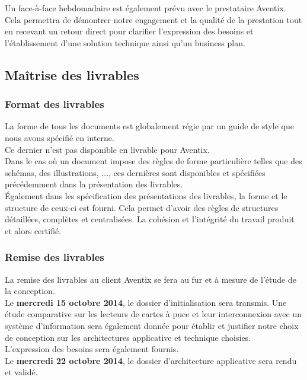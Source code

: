 Un face-à-face hebdomadaire est également prévu avec le prestataire Aventix.
Cela permettra de démontrer notre engagement et la qualité de la prestation
tout en recevant un retour direct pour clarifier l'expression des besoins et
l'établissement d'une solution technique ainsi qu'un business plan. \\

\subsection{Maîtrise des livrables}
\subsubsection{Format des livrables}
La forme de tous les documents est globalement régie par un guide de style que
nous avons spécifié en interne. \\
Ce dernier n'est pas disponible en livrable pour Aventix. \\

Dans le cas où un document impose des règles de forme particulière telles que
des schémas, des illustrations, ..., ces dernières sont disponibles et
spécifiées précédemment dans la présentation des livrables. \\

Également dans les spécification des présentations des livrables, la forme et
le structure de ceux-ci est fourni. Cela permet d'avoir des règles de
structures détaillées, complètes et centralisées. La cohésion et l'intégrité du
travail produit et alors certifié. \\

\subsubsection{Remise des livrables}
La remise des livrables au client Aventix se fera au fur et à mesure de l'étude
de la conception. \\

Le \textbf{mercredi 15 octobre 2014}, le dossier d'initialisation sera transmis.
Une étude comparative sur les lecteurs de cartes à puce et leur interconnexion
avec un système d'information sera également donnée pour établir et justifier
notre choix de conception sur les architectures applicative et technique
choisies. \\
L'expression des besoins sera également fournis. \\

Le \textbf{mercredi 22 octobre 2014}, le dossier d'architecture applicative sera rendu
et validé. \\

